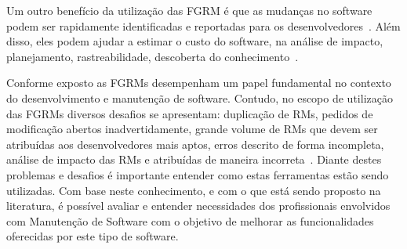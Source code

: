 Um outro benefício da utilização das FGRM é que as mudanças no
software podem ser rapidamente identificadas e reportadas para os
desenvolvedores~\cite{anvik2005coping}. Além disso, eles podem ajudar a estimar
o custo do software, na análise de impacto, planejamento, rastreabilidade,
descoberta do conhecimento~\cite{cavalcanti2013bug}.

Conforme exposto as FGRMs desempenham um papel fundamental no contexto do
desenvolvimento e manutenção de software. Contudo, no escopo de utilização das
FGRMs diversos desafios se apresentam: duplicação de RMs, pedidos de modificação
abertos inadvertidamente, grande volume de RMs que devem ser atribuídas aos
desenvolvedores mais aptos, erros descrito de forma incompleta, análise de
impacto das RMs e atribuídas de maneira
incorreta~\cite{cavalcanti2014challenges}. Diante destes problemas e desafios é
importante entender como estas ferramentas estão sendo utilizadas. Com base
neste conhecimento, e com  o que está sendo proposto na literatura, é possível
avaliar e entender necessidades dos profissionais envolvidos com Manutenção de
Software com o objetivo de melhorar as funcionalidades oferecidas por este tipo
de software.

%
%
%
%

